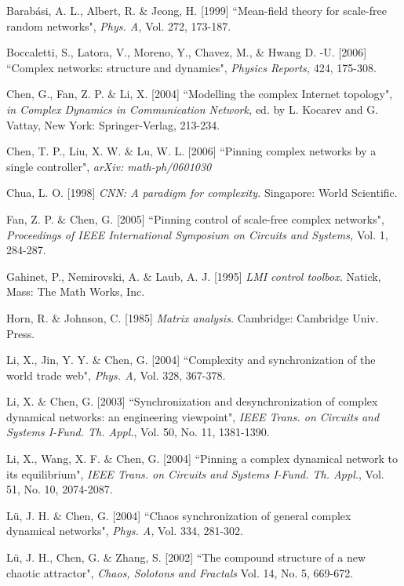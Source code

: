\documentclass[11pt]{article}
\begin{document}
\begin{thebibliography}{10}

 { Barab\'{a}si, A. L., Albert, R. $\&$ Jeong, H. [1999] ``Mean-field theory for scale-free
random networks", {\it Phys. A,} Vol. 272, 173-187.}

 { Boccaletti, S., Latora, V., Moreno, Y., Chavez, M., $\&$ Hwang D. -U. [2006]
``Complex networks: structure and dynamics",  {\it Physics Reports,}
424, 175-308.}

 { Chen, G., Fan, Z. P. $\&$ Li, X. [2004]  ``Modelling the complex Internet topology",
{\it in Complex Dynamics in Communication Network,} ed. by L.
Kocarev and G. Vattay, New York: Springer-Verlag, 213-234.}

 { Chen, T. P., Liu, X. W. $\&$  Lu, W. L. [2006]
``Pinning complex networks by a single controller", {\it arXiv:
math-ph/0601030}}

 { Chua, L. O. [1998] {\it CNN: A paradigm for complexity.}
\; Singapore: World Scientific.}

 { Fan, Z. P. $\&$ Chen, G. [2005]
``Pinning control of scale-free complex networks", {\it Proceedings
of IEEE International Symposium on Circuits and Systems,} Vol. 1,
284-287.}

 Gahinet, P., Nemirovski, A. $\&$ Laub, A. J. [1995] {\it LMI control toolbox.} \; Natick, Mass: The
Math Works, Inc.

 Horn, R. $\&$ Johnson, C. [1985] {\it Matrix analysis.} \;
Cambridge: Cambridge Univ. Press.

 { Li, X., Jin, Y. Y. $\&$  Chen, G. [2004]
``Complexity and synchronization of the world trade web", {\it Phys.
A,} Vol. 328, 367-378.}

 { Li, X. $\&$  Chen, G. [2003]
``Synchronization and desynchronization of complex dynamical
networks: an engineering viewpoint", {\it IEEE Trans. on Circuits
and Systems I-Fund. Th. Appl.}, Vol. 50, No. 11, 1381-1390.}

 { Li, X., Wang, X. F. $\&$  Chen, G. [2004]
``Pinning a complex dynamical network to its equilibrium", {\it IEEE
Trans. on Circuits and Systems I-Fund. Th. Appl.}, Vol. 51, No. 10,
2074-2087.}

 { L\"{u}, J. H. $\&$ Chen, G. [2004] ``Chaos synchronization of general complex dynamical
networks",  {\it Phys. A,} Vol. 334, 281-302.}

 { L\"{u}, J. H., Chen, G. $\&$ Zhang, S. [2002] ``The compound structure of a
new chaotic attractor",  {\it Chaos, Solotons and Fractals} Vol. 14,
No. 5, 669-672.}


\end{thebibliography}
\end{document}
